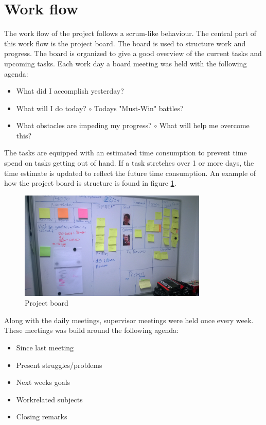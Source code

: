 \section{Work flow}
The work flow of the project follows a scrum-like behaviour. The central part of this  work flow is the project board. The board is used to structure work and progress. The board is organized to give a good overview of the current tasks and upcoming tasks. Each work day a board meeting was held with the following agenda:
\begin{itemize}
	\item What did I accomplish yesterday?
	\item What will I do today?
	\subitem $\circ$ Todays "Must-Win" battles?
	\item What obstacles are impeding my progress?
	\subitem $\circ$ What will help me overcome this?
\end{itemize}

The tasks are equipped with an estimated time consumption to prevent time spend on tasks getting out of hand. If a task stretches over 1 or more days, the time estimate is updated to reflect the future time consumption. An example of how the project board is structure is found in figure \ref{fig:prjboard}.

\begin{figure}[hbpt]
	\centering
	\includegraphics[width=0.8\textwidth]{billeder/9projectexecution/board}
	\caption{Project board}
	\label{fig:prjboard}
\end{figure}

Along with the daily meetings, supervisor meetings were held once every week. These meetings was build around the following agenda:
\begin{itemize}
	\item Since last meeting
	\item Present struggles/problems
	\item Next weeks goals
	\item Workrelated subjects
	\item Closing remarks
\end{itemize}


